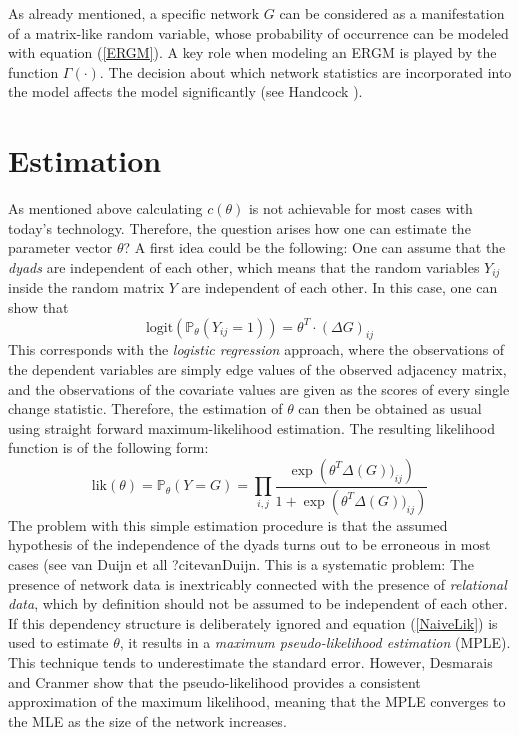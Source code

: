 \documentclass[headsepline=true, abstracton]{scrartcl}
\begin{document}
%
As already mentioned, a specific network $G$ can be considered as a manifestation of a matrix-like random variable, whose probability of occurrence can be modeled with equation (\ref{ERGM}).
A key role when modeling an ERGM is played by the function $\Gamma(\cdot)$. The decision about which network statistics are incorporated into the model affects the model significantly (see Handcock \cite{Handcock.2003}).

\section*{Estimation}
As mentioned above calculating $c(\theta)$ is not achievable for most cases with today's technology. Therefore, the question arises how one can estimate the parameter vector $\theta$?
A first idea could be the following: One can assume that the \textit{dyads} are independent of each other, which means that the random variables $Y_{ij}$ inside the random matrix $Y$ are independent of each other. 
In this case, one can show that
%
\begin{equation*}
\text{logit}(\mathbb{P}_{\theta}(Y_{ij}=1))= \theta^T \cdot (\Delta G)_{ij}
\end{equation*}
This corresponds with the \textit{logistic regression} approach, where the observations of the dependent variables are simply edge values of the observed adjacency matrix, and the observations of the covariate values are given as the scores of every single change statistic. Therefore, the estimation of $\theta$ can then be obtained as usual using straight forward maximum-likelihood estimation. The resulting likelihood function is of the following form:
\begin{equation}
\text{lik}(\theta)= \mathbb{P}_{\theta}(Y=G)= \prod_{i,j} \dfrac{ \exp \left(\theta^T \Delta(G))_{ij} \right)}{1+\exp \left(\theta^T \Delta(G))_{ij} \right)}
\label{NaiveLik}
\end{equation}
The problem with this simple estimation procedure is that the assumed hypothesis of the independence of the dyads turns out to be erroneous in most cases (see van Duijn et all ?citevanDuijn. This is a systematic problem: The presence of network data is inextricably connected with the presence of \textit{relational data}, which by definition should not be assumed to be independent of each other. If this dependency structure is deliberately ignored and equation (\ref{NaiveLik}) is used to estimate $\theta$, it results in a \textit{maximum pseudo-likelihood estimation} (MPLE). This technique tends to underestimate the standard error. However, Desmarais and Cranmer \cite{Desmarais.2012} show that the pseudo-likelihood provides a consistent approximation of the maximum likelihood, meaning that the MPLE converges to the MLE as the size of the network increases.\\[0.3cm]
\end{document}
